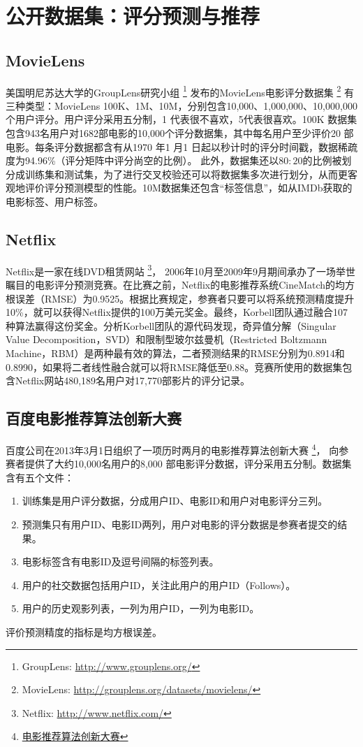 \section{公开数据集：评分预测与推荐}
\subsection{MovieLens}
美国明尼苏达大学的GroupLens研究小组
\footnote{GroupLens: \href{http://www.grouplens.org/}{http://www.grouplens.org/}}
发布的MovieLens电影评分数据集
\footnote{MovieLens: \href{http://grouplens.org/datasets/movielens/}{http://grouplens.org/datasets/movielens/}}
有三种类型：MovieLens 100K、1M、10M，分别包含10,000、1,000,000、10,000,000 个用户评分。用户评分采用五分制，1 代表很不喜欢，5代表很喜欢。100K 数据集包含943名用户对1682部电影的10,000个评分数据集，其中每名用户至少评价20 部电影。每条评分数据都含有从1970 年1 月1 日起以秒计时的评分时间戳，数据稀疏度为94.96\%（评分矩阵中评分尚空的比例）。 此外，数据集还以$80:20$的比例被划分成训练集和测试集，为了进行交叉校验还可以将数据集多次进行划分，从而更客观地评价评分预测模型的性能。10M数据集还包含“标签信息”，如从IMDb获取的电影标签、用户标签。

\subsection{Netflix}
Netflix是一家在线DVD租赁网站
\footnote{Netflix: \href{http://www.netflix.com/}{http://www.netflix.com/}}，
2006年10月至2009年9月期间承办了一场举世瞩目的电影评分预测竞赛。在比赛之前，Netflix的电影推荐系统CineMatch的均方根误差（RMSE）为0.9525。根据比赛规定，参赛者只要可以将系统预测精度提升10\%，就可以获得Netflix提供的100万美元奖金。最终，Korbell团队通过融合107种算法赢得这份奖金。分析Korbell团队的源代码发现，奇异值分解（Singular Value Decomposition，SVD）和限制型玻尔兹曼机（Restricted Boltzmann Machine，RBM）是两种最有效的算法，二者预测结果的RMSE分别为0.8914和0.8990，如果将二者线性融合就可以将RMSE降低至0.88。竞赛所使用的数据集包含Netflix网站480,189名用户对17,770部影片的评分记录。

\subsection{百度电影推荐算法创新大赛}
百度公司在2013年3月1日组织了一项历时两月的电影推荐算法创新大赛
\footnote{\href{http://openresearch.baidu.com/}{电影推荐算法创新大赛}}，
向参赛者提供了大约10,000名用户的8,000 部电影评分数据，评分采用五分制。数据集含有五个文件：
\begin{enumerate}
    \item 训练集是用户评分数据，分成用户ID、电影ID和用户对电影评分三列。
    \item 预测集只有用户ID、电影ID两列，用户对电影的评分数据是参赛者提交的结果。
    \item 电影标签含有电影ID及逗号间隔的标签列表。
    \item 用户的社交数据包括用户ID，关注此用户的用户ID（Follows）。
    \item 用户的历史观影列表，一列为用户ID，一列为电影ID。
\end{enumerate}
评价预测精度的指标是均方根误差。

